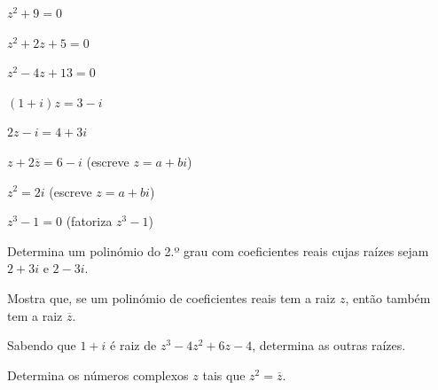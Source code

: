 \documentclass[12pt]{article}
\begin{document}
\begin{exercicios}
  \item $z^2 + 9 = 0$
  \item $z^2 + 2z + 5 = 0$
  \item $z^2 - 4z + 13 = 0$
  \item $(1 + i)z = 3 - i$
  \item $2z - i = 4 + 3i$
  \item $z + 2\overline{z} = 6 - i$ \; (escreve $z = a + bi$)
  \item $z^2 = 2i$ \; (escreve $z = a + bi$)
  \item $z^3 - 1 = 0$ \; (fatoriza $z^3 - 1$)
\end{exercicios}

\begin{exercicios}
  \item Determina um polinómio do 2.º grau com coeficientes reais cujas raízes sejam $2 + 3i$ e $2 - 3i$.
  \item Mostra que, se um polinómio de coeficientes reais tem a raiz $z$, então também tem a raiz $\overline{z}$.
  \item Sabendo que $1 + i$ é raiz de $z^3 - 4z^2 + 6z - 4$, determina as outras raízes.
  \item Determina os números complexos $z$ tais que $z^2 = \overline{z}$.
\end{exercicios}
\end{document}
